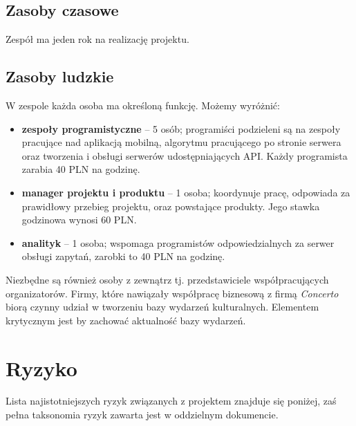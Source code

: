 \documentclass[10pt]{dokument-ppi}
\begin{document}
\subsection{Zasoby czasowe}
Zespół ma jeden rok na realizację projektu.

\subsection{Zasoby ludzkie}
W zespole każda osoba ma określoną funkcję. Możemy wyróżnić:
\begin{itemize}
    \item \textbf{zespoły programistyczne} -- 5 osób; programiści podzieleni są
        na zespoły pracujące nad aplikacją mobilną, algorytmu pracującego po
        stronie serwera oraz tworzenia i obsługi serwerów udostępniających API.
        Każdy programista zarabia 40 PLN na godzinę.
    \item \textbf{manager projektu i produktu} -- 1 osoba; koordynuje pracę,
        odpowiada za prawidłowy przebieg projektu, oraz powstające produkty.
        Jego stawka godzinowa wynosi 60 PLN.
    \item \textbf{analityk} -- 1 osoba; wspomaga programistów odpowiedzialnych za serwer
        obsługi zapytań, zarobki to 40 PLN na godzinę.
\end{itemize}
Niezbędne są również osoby z zewnątrz tj. przedstawiciele współpracujących
organizatorów. Firmy, które nawiązały współpracę biznesową z firmą
\emph{Concerto} biorą czynny udział w tworzeniu bazy wydarzeń kulturalnych.
Elementem krytycznym jest by zachować aktualność bazy wydarzeń.


\section{Ryzyko}
Lista najistotniejszych ryzyk związanych z projektem znajduje się poniżej, zaś
pełna taksonomia ryzyk zawarta jest w oddzielnym dokumencie.
\end{document}
